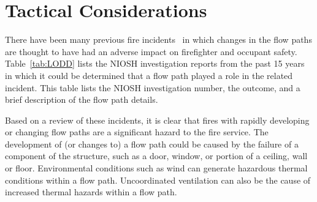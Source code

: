 \documentclass[12pt,oneside]{book}
\begin{document}
%  
% 

%  
% 

%  
% 

\section{Tactical Considerations}
\label{sec:tactical_condsiderations}

There have been many previous fire incidents~\cite{NIOSH:Pettit,NIOSH:Washenitz,NIOSH:Mezzanotte,NIOSH:McFall,NIOSH:McFall2,NIOSH:McFall3,NIOSH:Berardinelli,NIOSH:Koedam,NIOSH:McFall4,NIOSH:Tarley,NIOSH:Braddee,NIOSH:Merinar,NIOSH:Bowyer2,NIOSH:Loflin,NIOSH:Bowyer} in which changes in the flow paths are thought to have had an adverse impact on firefighter and occupant safety. Table~\ref{tab:LODD} lists the NIOSH investigation reports from the past 15 years in which it could be determined that a flow path played a role in the related incident. This table lists the NIOSH investigation number, the outcome, and a brief description of the flow path details.

Based on a review of these incidents, it is clear that fires with rapidly developing or changing flow paths are a significant hazard to the fire service. The development of (or changes to) a flow path could be caused by the failure of a component of the structure, such as a door, window, or portion of a ceiling, wall or floor. Environmental conditions such as wind can generate hazardous thermal conditions within a flow path. Uncoordinated ventilation can also be the cause of increased thermal hazards within a flow path. 
\end{document}
